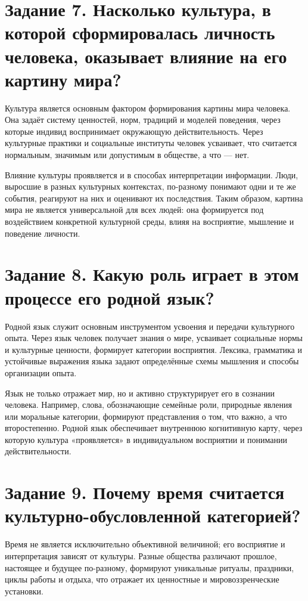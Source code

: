 \documentclass[14pt,a4paper]{extarticle}
\begin{document}
\section{Задание 7. Насколько культура, в которой сформировалась личность
человека, оказывает влияние на его картину мира?} Культура является основным
фактором формирования картины мира человека. Она задаёт систему ценностей,
норм, традиций и моделей поведения, через которые индивид воспринимает
окружающую действительность. Через культурные практики и социальные институты
человек усваивает, что считается нормальным, значимым или допустимым в
обществе, а что — нет.

Влияние культуры проявляется и в способах интерпретации информации. Люди,
выросшие в разных культурных контекстах, по-разному понимают одни и те же
события, реагируют на них и оценивают их последствия. Таким образом, картина
мира не является универсальной для всех людей: она формируется под воздействием
конкретной культурной среды, влияя на восприятие, мышление и поведение
личности.

\section{Задание 8. Какую роль играет в этом процессе его родной язык?}
Родной язык служит основным инструментом усвоения и передачи культурного опыта.
Через язык человек получает знания о мире, усваивает социальные нормы и
культурные ценности, формирует категории восприятия. Лексика, грамматика и
устойчивые выражения языка задают определённые схемы мышления и способы
организации опыта.

Язык не только отражает мир, но и активно структурирует его в сознании
человека. Например, слова, обозначающие семейные роли, природные явления или
моральные категории, формируют представления о том, что важно, а что
второстепенно. Родной язык обеспечивает внутреннюю когнитивную карту, через
которую культура «проявляется» в индивидуальном восприятии и понимании
действительности.

\section{Задание 9. Почему время считается культурно-обусловленной категорией?}
Время не является исключительно объективной величиной; его восприятие и
интерпретация зависят от культуры. Разные общества различают прошлое, настоящее
и будущее по-разному, формируют уникальные ритуалы, праздники, циклы работы и
отдыха, что отражает их ценностные и мировоззренческие установки.
\end{document}
